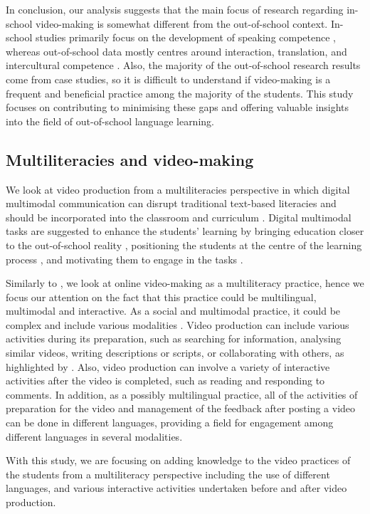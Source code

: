 In conclusion, our analysis suggests that the main focus of research
regarding in-school video-making is somewhat different from the
out-of-school context. In-school studies primarily focus on the
development of speaking competence \cite{asio2023,devana2021,tan2022,zaitun2021},
whereas out-of-school data mostly centres around interaction,
translation, and intercultural competence \cite{gonulal2019,vazquez2022,zhang2022}. Also, the majority
of the out-of-school research results come from case studies, so it is
difficult to understand if video-making is a frequent and beneficial
practice among the majority of the students. This study focuses on
contributing to minimising these gaps and offering valuable insights
into the field of out-of-school language learning.

\subsection{Multiliteracies and video-making}\label{sub-sec-multiliteracies}

We look at video production from a multiliteracies perspective in which
digital multimodal communication can disrupt traditional text-based
literacies and should be incorporated into the classroom and curriculum
\cite{cope2015,thorne2013}. Digital multimodal tasks are
suggested to enhance the students' learning by bringing education closer
to the out-of-school reality \cite{ito2013}, positioning the
students at the centre of the learning process \cite{cope2009}, and motivating them to engage in the tasks \cite{muñoz-basols2019}.

Similarly to \textcite{yeh2018}, we look at online video-making as a
multiliteracy practice, hence we focus our attention on the fact that
this practice could be multilingual, multimodal and interactive. As a
social and multimodal practice, it could be complex and include various
modalities \cite{cope2009}. Video production can include
various activities during its preparation, such as searching for
information, analysing similar videos, writing descriptions or scripts,
or collaborating with others, as highlighted by \textcite{yeh2018}. Also, video
production can involve a variety of interactive activities after the
video is completed, such as reading and responding to comments. In
addition, as a possibly multilingual practice, all of the activities of
preparation for the video and management of the feedback after posting a
video can be done in different languages, providing a field for
engagement among different languages in several modalities.

With this study, we are focusing on adding knowledge to the video
practices of the students from a multiliteracy perspective including the
use of different languages, and various interactive activities
undertaken before and after video production.